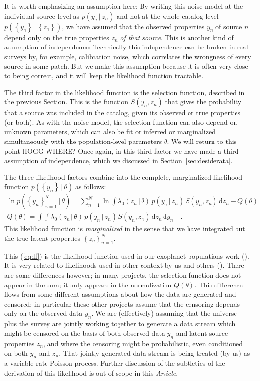 \documentclass[modern]{aastex62}
\newcommand{\dd}{\mathrm{d}}
\newcommand{\given}{\,|\,}
\newcommand{\set}[1]{\left\{{#1}\right\}}
\newcommand{\documentname}{\textsl{Article}}
\newcommand{\sectionname}{Section}
\begin{document}
It is worth emphasizing an assumption here:
By writing this noise model at the individual-source level as
$p(y_n\given z_n)$
and not at the whole-catalog level
$p(\set{y_n}\given\set{z_n})$,
we have assumed that the observed properties $y_n$ of source $n$
depend only on the true properties $z_n$ \emph{of that source}.
This is another kind of assumption of independence:
Technically this independence can be broken in real surveys by,
for example, calibration noise, which correlates the wrongness of
every source in some patch.
But we make this assumption because it is often very close to being
correct, and it will keep the likelihood function tractable.

The third factor in the likelihood function is the selection function,
described in the previous \sectionname.
This is the function $S(y_n,z_n)$ that gives the probability that a
source was included in the catalog, given its observed or true
properties (or both).
As with the noise model, the selection function can also depend on
unknown parameters, which can also be fit or inferred or marginalized
simultaneously with the population-level parameters $\theta$.
We will return to this point HOGG WHERE?
Once again, in this third factor we have made a third assumption of
independence, which we discussed in \sectionname~\ref{sec:desiderata}.

The three likelihood factors combine into the complete, marginalized
likelihood function $p(\set{y_n}\given\theta)$ as follows:
\begin{gather}
\ln p(\set{y_n}_{n=1}^{N}\given\theta)
 = \sum_{n=1}^N \ln\int\lambda_0(z_n\given \theta)\,p(y_n\given z_n)\,S(y_n, z_n)\,\dd z_n - Q(\theta)
\label{eq:lf}
\\
Q(\theta) = \int\!\int\lambda_0(z_n\given \theta)\,p(y_n\given z_n)\,S(y_n, z_n)\,\dd z_n\,\dd y_n
\quad .
\end{gather}
This likelihood function is \emph{marginalized} in the sense that we
have integrated out the true latent properties $\set{z_n}_{n=1}^N$.

This (\ref{eq:lf}) is the likelihood function used in our exoplanet
populations work (\citealt{exopop}).
It is very related to likelihoods
used in other context by us and others (\citealt{loredogrb, bernstein,
  bovy, mfg}).
There are some differences however;
in many projects, the selection function
does not appear in the sum; it only appears in the normalization $Q(\theta)$.
This difference flows from some different assumptions about how the
data are generated and censored; in particular these other projects assume
that the censoring depends only on the observed data $y_n$.
We are (effectively) assuming that the universe plus the survey are
jointly working together to generate a data stream which might be
censored on the basis of both observed data $y_n$ and latent source
properties $z_n$, and where the censoring might be probabilistic, even
conditioned on both $y_n$ and $z_n$.
That jointly generated data stream is being treated (by us) as a
variable-rate Poisson process.
Further discussion of the subtleties of the derivation of this
likelihood is out of scope in this \documentname.
\end{document}

